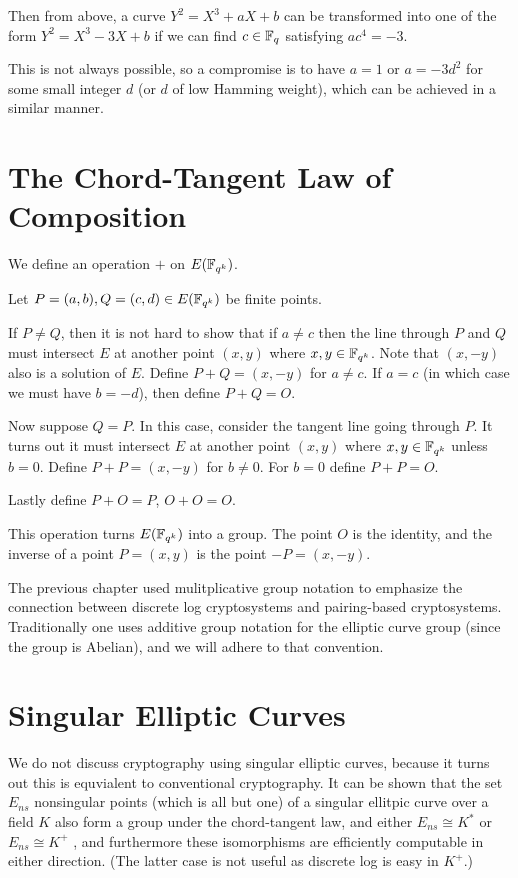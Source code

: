 Then from above, a curve $Y^2 = X^3 + aX + b$ can be transformed into
one of the form $Y^2 = X^3 - 3X + b$ if we can find $c\in \mathbb{F}_q$
satisfying $a c^4 = -3$.

This is not always possible, so a compromise is to have
$a = 1$ or $a = -3 d^2$ for some small integer $d$
(or $d$ of low Hamming weight), which can be achieved in a similar manner.

\section {The Chord-Tangent Law of Composition}

We define an operation $+$ on $E(\mathbb{F}_{q^k})$.

Let $P = (a,b), Q = (c,d) \in E(\mathbb{F}_{q^k})$ be finite points.

If $P \ne Q$, then it is not hard to show that if $a \ne c$
then the line through $P$ and $Q$ must intersect $E$ at another point
$(x,y)$ where $x, y\in \mathbb{F}_{q^k}$. Note that $(x,-y)$ also is a solution of $E$.
Define $P + Q = (x, -y)$ for $a \ne c$.
If $a = c$ (in which case we must have $b = -d$),
then define $P + Q = O$.

Now suppose $Q = P$. In this case, consider the tangent line going through
$P$. It turns out it must intersect $E$ at another point $(x,y)$ where
$x,y\in\mathbb{F}_{q^k}$ unless $b = 0$. Define $P + P = (x, -y)$ for $b \ne 0$.
For $b = 0$ define $P + P = O$.

Lastly define $P + O = P$, $O + O = O$.

This operation turns $E(\mathbb{F}_{q^k})$ into a group.
The point $O$ is the identity, and the inverse
of a point $P = (x,y)$ is the point $-P = (x,-y)$.

The previous chapter used mulitplicative group notation to emphasize
the connection
between discrete log cryptosystems and pairing-based cryptosystems.
Traditionally one uses additive group notation for the elliptic curve group
(since the group is Abelian), and we will adhere to that convention.

\section {Singular Elliptic Curves}

We do not discuss cryptography using
singular elliptic curves, because it turns out this
is equvialent to conventional cryptography.
It can be shown that the set $E_{ns}$ nonsingular points (which is all but
one) of a singular ellitpic curve over a field $K$
also form a group under the chord-tangent law,
and either $E_{ns} \cong K^*$ or $E_{ns} \cong K^+$ \cite{prop2.5silverman},
and furthermore these isomorphisms are efficiently computable in either
direction.
(The latter case is not useful as discrete log is easy in $K^+$.)

